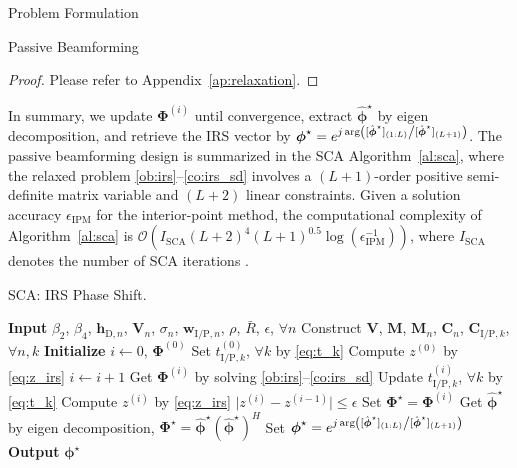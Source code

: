 \documentclass[journal]{IEEEtran}
\begin{document}
\begin{section}{Problem Formulation}
\begin{subsection}{Passive Beamforming}
			\begin{proof}\label{pf:relaxation}
				Please refer to Appendix~\ref{ap:relaxation}.
			\end{proof}

			In summary, we update $\boldsymbol{\Phi}^{(i)}$ until convergence, extract $\hat{\boldsymbol{\phi}}^\star$ by eigen decomposition, and retrieve the	IRS vector by $\boldsymbol{\phi}^{\star}=e^{j \arg\left([\hat{\boldsymbol{\phi}}^\star]_{(1:L)} \middle/ [\hat{\boldsymbol{\phi}}^\star]_{(L+1)}\right)}$. The passive beamforming design is summarized in the SCA Algorithm~\ref{al:sca}, where the relaxed problem \eqref{ob:irs}--\eqref{co:irs_sd} involves a $(L+1)$-order positive semi-definite matrix variable and $(L+2)$ linear constraints. Given a solution accuracy $\epsilon_{\mathrm{IPM}}$ for the interior-point method, the computational complexity of Algorithm~\ref{al:sca} is $\mathcal{O}\left(I_{\mathrm{SCA}}(L+2)^4 (L+1)^{0.5} \log(\epsilon_{\mathrm{IPM}}^{-1})\right)$, where $I_{\mathrm{SCA}}$ denotes the number of SCA iterations \cite{Luo2010}.

			\begin{algorithm}[!t]
				\caption{SCA: IRS Phase Shift.}
				\label{al:sca}
				\begin{algorithmic}[1]
					\State \textbf{Input} $\beta_2$, $\beta_4$, $\boldsymbol{h}_{\mathrm{D},n}$, $\boldsymbol{V}_{n}$, $\sigma_n$, $\boldsymbol{w}_{\mathrm{I/P},n}$, $\rho$, $\bar{R}$, $\epsilon$, $\forall n$
					\State Construct $\boldsymbol{V}$, $\boldsymbol{M}$, $\boldsymbol{M}_n$, $\boldsymbol{C}_{n}$, $\boldsymbol{C}_{\mathrm{I/P},k}$, $\forall n,k$
					\State \textbf{Initialize} $i \gets 0$, $\boldsymbol{\Phi}^{(0)}$
					\State Set $t_{\mathrm{I/P},k}^{(0)}$, $\forall k$ by \eqref{eq:t_k}
					\State Compute $z^{(0)}$ by \eqref{eq:z_irs}
					\Repeat
						\State $i \gets i + 1$
						\State Get $\boldsymbol{\Phi}^{(i)}$ by solving \eqref{ob:irs}--\eqref{co:irs_sd}
						\State Update $t_{\mathrm{I/P},k}^{(i)}$, $\forall k$ by \eqref{eq:t_k}
						\State Compute $z^{(i)}$ by \eqref{eq:z_irs}
					\Until $\lvert z^{(i)}-z^{(i-1)} \rvert \le \epsilon$
					\State Set $\boldsymbol{\Phi}^{\star}=\boldsymbol{\Phi}^{(i)}$
					\State Get $\hat{\boldsymbol{\phi}}^\star$ by eigen decomposition, $\boldsymbol{\Phi}^{\star}=\hat{\boldsymbol{\phi}}^\star(\hat{\boldsymbol{\phi}}^\star)^H$
					\State Set $\boldsymbol{\phi}^{\star}=e^{j \arg\left([\hat{\boldsymbol{\phi}}^\star]_{(1:L)} \middle/ [\hat{\boldsymbol{\phi}}^\star]_{(L+1)}\right)}$
					\State \textbf{Output} $\boldsymbol{\phi}^{\star}$
				\end{algorithmic}
			\end{algorithm}


\end{subsection}
\end{section}
\end{document}
